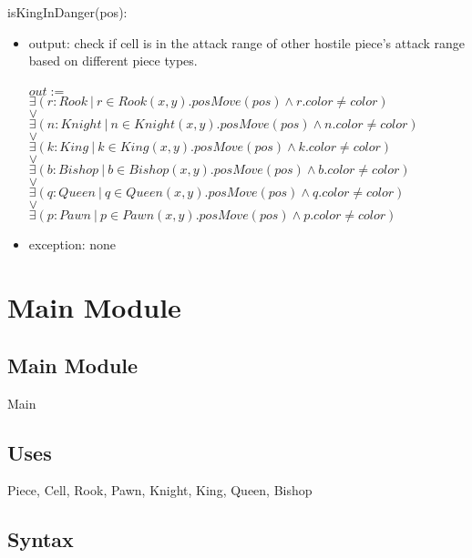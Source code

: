 \documentclass[12pt]{article}
\begin{document}
\noindent isKingInDanger(pos):
\begin{itemize}
\item output: check if cell is in the attack range of other hostile piece's attack range based on different piece types.\\
\\
$out :=$\\
$\exists(r : Rook \ | \ r \in Rook(x,y).posMove(pos) \wedge r.color \ne color) $ \\
$\vee$\\
$\exists(n : Knight\ | \ n \in Knight(x,y).posMove(pos)\wedge n.color \ne color) $ \\
$\vee$\\
$\exists(k : King \ | \ k \in King(x,y).posMove(pos)\wedge k.color \ne color) $ \\
$\vee$\\
$\exists(b : Bishop\ | \ b \in Bishop(x,y).posMove(pos)\wedge b.color \ne color) $ \\
$\vee$\\
$\exists(q : Queen \ | \ q \in Queen(x,y).posMove(pos)\wedge q.color \ne color) $ \\
$\vee$\\
$\exists(p : Pawn\ | \ p \in Pawn(x,y).posMove(pos)\wedge p.color \ne color) $ \\
\item exception: none
\end{itemize}

\newpage



\section* {Main Module}

\subsection* {Main Module}

Main

\subsection* {Uses}

Piece, Cell, Rook, Pawn, Knight, King, Queen, Bishop

\subsection* {Syntax}
\end{document}
